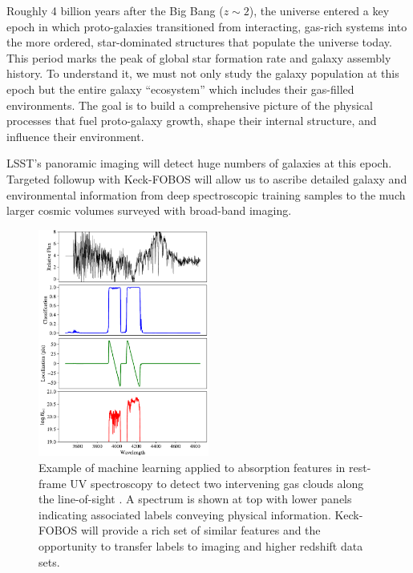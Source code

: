 \documentclass[oneside,11pt]{amsart}
\begin{document}
Roughly 4 billion years after the Big Bang ($z \sim 2$), the universe entered a key epoch in which proto-galaxies
transitioned from interacting, gas-rich systems into the more ordered, star-dominated structures that populate the
universe today.  This period marks the peak of global star formation rate and galaxy assembly history.   To understand
it, we must not only study the galaxy population at this epoch but the entire galaxy ``ecosystem'' which includes their
gas-filled environments.  The goal is to build a comprehensive picture of the physical processes that fuel proto-galaxy
growth, shape their internal structure, and influence their environment.

LSST's panoramic imaging will detect huge numbers of galaxies at this epoch.  Targeted followup with Keck-FOBOS will
allow us to ascribe detailed galaxy and environmental information from deep spectroscopic training samples to the much
larger cosmic volumes surveyed with broad-band imaging.


\begin{figure}[h!]
 \vskip -0.1in
 \includegraphics[width=0.5\textwidth]{Parks18_Fig7_fig_labels.pdf}
 \caption{\small Example of machine learning applied to absorption features in rest-frame UV spectroscopy to detect two intervening gas clouds along the line-of-sight \citep[from][]{parks18}.  A spectrum is shown at top with lower panels indicating associated labels conveying physical information.  Keck-FOBOS will provide a rich set of similar features and the opportunity to transfer labels to imaging and higher redshift data sets.}\label{fig:absorber}
\end{figure}
\end{document}
